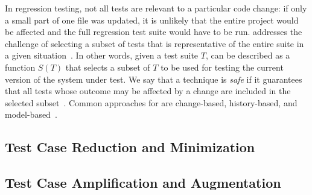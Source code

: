 In regression testing, not all tests are relevant to a particular code change:
if only a small part of one file was updated, it is unlikely that the entire project would be affected and the full regression test suite would have to be run.
\tcs addresses the challenge of selecting a subset of tests that is representative of the entire suite in a given situation~\cite{YooHarman10RegressionTestingSurvey, RothermelHarrold94FrameworkForEvaluationRTS}.
In other words, given a test suite $T$, 
\tcs can be described as a function $S(T)$ that selects a subset of $T$ to be used for testing the current version of the system under test.
We say that a \tcs technique is \emph{safe} if it guarantees that all tests whose outcome may be affected by a change are included in the selected subset~\cite{RothermelHarrold94FrameworkForEvaluationRTS}. 
Common approaches for \tcs are change-based, history-based, and model-based~\cite{kazmi_effective_2017}.

\subsection{Test Case Reduction and Minimization}\label{sec:tsr}

\subsection{Test Case Amplification and Augmentation}\label{sec:tsa}
